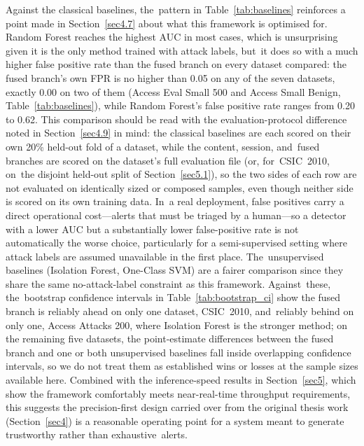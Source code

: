 \documentclass[futureinternet,article,accept,moreauthors]{Definitions/mdpi}
\begin{document}
Against the classical baselines, the~pattern in Table~\ref{tab:baselines} reinforces a point made in Section~\ref{sec4.7} about what this framework is optimised for. Random Forest reaches the highest AUC in most cases, which is unsurprising given it is the only method trained with attack labels, but~it does so with a much higher false positive rate than the fused branch on every dataset compared: the fused branch's own FPR is no higher than 0.05 on any of the seven datasets, exactly 0.00 on two of them (Access Eval Small 500 and Access Small Benign, Table~\ref{tab:baselines}), while Random Forest's false positive rate ranges from 0.20 to 0.62. This comparison should be read with the evaluation-protocol difference noted in Section~\ref{sec4.9} in mind: the classical baselines are each scored on their own 20\% held-out fold of a dataset, while the content, session, and~fused branches are scored on the dataset's full evaluation file (or, for~CSIC~2010, on~the disjoint held-out split of Section~\ref{sec5.1}), so the two sides of each row are not evaluated on identically sized or composed samples, even though neither side is scored on its own training data. In~a real deployment, false positives carry a direct operational cost---alerts that must be triaged by a human---so a detector with a lower AUC but a substantially lower false-positive rate is not automatically the worse choice, particularly for a semi-supervised setting where attack labels are assumed unavailable in the first place. The~unsupervised baselines (Isolation Forest, One-Class SVM) are a fairer comparison since they share the same no-attack-label constraint as this framework. Against~these, the~bootstrap confidence intervals in Table~\ref{tab:bootstrap_ci} show the fused branch is reliably ahead on only one dataset, CSIC~2010, and~reliably behind on only one, Access Attacks 200, where Isolation Forest is the stronger method; on the remaining five datasets, the point-estimate differences between the fused branch and one or both unsupervised baselines fall inside overlapping confidence intervals, so we do not treat them as established wins or losses at the sample sizes available here. Combined with the inference-speed results in Section~\ref{sec5}, which show the framework comfortably meets near-real-time throughput requirements, this suggests the precision-first design carried over from the original thesis work (Section~\ref{sec4}) is a reasonable operating point for a system meant to generate trustworthy rather than exhaustive~alerts.
\end{document}

